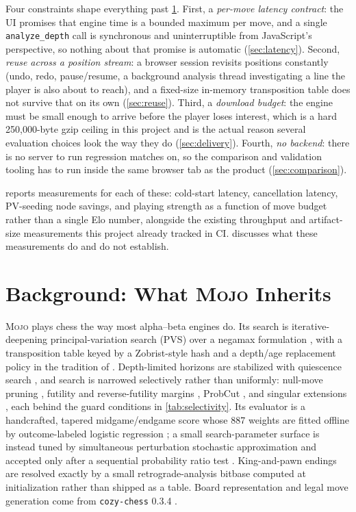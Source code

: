 \documentclass[10pt,twocolumn]{article}
\newcommand{\engine}{\textsc{Mojo}}
\newcommand{\code}[1]{\texttt{#1}}
\begin{document}
Four constraints shape everything past \cref{sec:background}.  First, a
\emph{per-move latency contract}: the UI promises that engine time is a
bounded maximum per move, and a single \code{analyze\_depth} call is
synchronous and uninterruptible from JavaScript's perspective, so nothing
about that promise is automatic (\cref{sec:latency}).  Second, \emph{reuse
across a position stream}: a browser session revisits positions constantly
(undo, redo, pause/resume, a background analysis thread investigating a line
the player is also about to reach), and a fixed-size in-memory transposition
table does not survive that on its own (\cref{sec:reuse}).  Third, a
\emph{download budget}: the engine must be small enough to arrive before the
player loses interest, which is a hard 250,000-byte gzip ceiling in this
project and is the actual reason several evaluation choices look the way
they do (\cref{sec:delivery}).  Fourth, \emph{no backend}: there is no
server to run regression matches on, so the comparison and validation
tooling has to run inside the same browser tab as the product
(\cref{sec:comparison}).

 reports measurements for each of these: cold-start
latency, cancellation latency, PV-seeding node savings, and playing strength
as a function of move budget rather than a single Elo number, alongside the
existing throughput and artifact-size measurements this project already
tracked in CI.  discusses what these measurements do
and do not establish.

\section{Background: What \texorpdfstring{\engine}{Mojo} Inherits}
\label{sec:background}

\engine{} plays chess the way most alpha--beta engines do.  Its search is
iterative-deepening principal-variation search (PVS) over a negamax
formulation \citep{marsland1987sss}, with a transposition table keyed by a
Zobrist-style hash \citep{zobrist1970hashing} and a depth/age replacement
policy in the tradition of \citet{breuker1994tt}.  Depth-limited horizons are
stabilized with quiescence search \citep{beal1990quiescence}, and search is
narrowed selectively rather than uniformly: null-move pruning
\citep{donninger1993null}, futility and reverse-futility margins
\citep{heinz1998futility}, ProbCut \citep{buro1995probcut}, and singular
extensions \citep{anantharaman1990singular}, each behind the guard conditions
in \cref{tab:selectivity}.  Its evaluator is a handcrafted, tapered
midgame/endgame score whose 887 weights are fitted offline by outcome-labeled
logistic regression \citep{buro1995features}; a small search-parameter
surface is instead tuned by simultaneous perturbation stochastic
approximation \citep{spall1992spsa} and accepted only after a sequential
probability ratio test \citep{wald1945sprt}.  King-and-pawn endings are
resolved exactly by a small retrograde-analysis bitbase computed at
initialization \citep{thompson1986retrograde} rather than shipped as a table.
Board representation and legal move generation come from \code{cozy-chess}
0.3.4 \citep{cozychess2026}.
\end{document}
